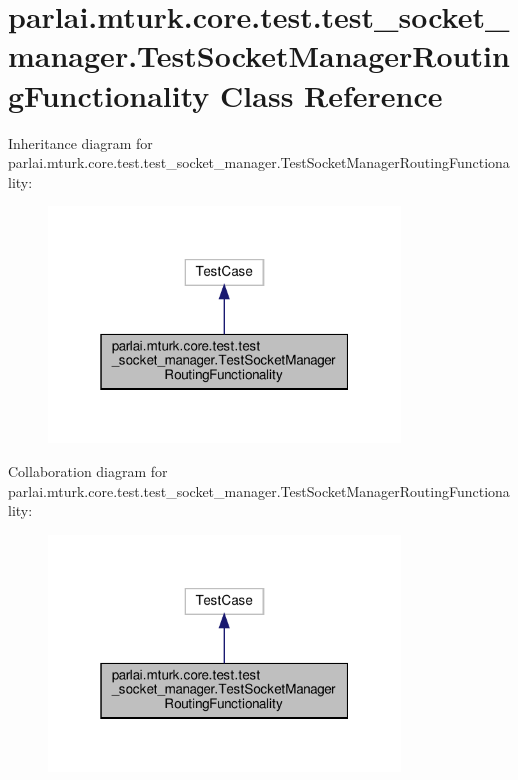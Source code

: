 \hypertarget{classparlai_1_1mturk_1_1core_1_1test_1_1test__socket__manager_1_1TestSocketManagerRoutingFunctionality}{}\section{parlai.\+mturk.\+core.\+test.\+test\+\_\+socket\+\_\+manager.\+Test\+Socket\+Manager\+Routing\+Functionality Class Reference}
\label{classparlai_1_1mturk_1_1core_1_1test_1_1test__socket__manager_1_1TestSocketManagerRoutingFunctionality}


Inheritance diagram for parlai.\+mturk.\+core.\+test.\+test\+\_\+socket\+\_\+manager.\+Test\+Socket\+Manager\+Routing\+Functionality\+:\nopagebreak
\begin{figure}[H]
\begin{center}
\leavevmode
\includegraphics[width=265pt]{db/d6b/classparlai_1_1mturk_1_1core_1_1test_1_1test__socket__manager_1_1TestSocketManagerRoutingFunctionality__inherit__graph}
\end{center}
\end{figure}


Collaboration diagram for parlai.\+mturk.\+core.\+test.\+test\+\_\+socket\+\_\+manager.\+Test\+Socket\+Manager\+Routing\+Functionality\+:\nopagebreak
\begin{figure}[H]
\begin{center}
\leavevmode
\includegraphics[width=265pt]{dc/d51/classparlai_1_1mturk_1_1core_1_1test_1_1test__socket__manager_1_1TestSocketManagerRoutingFunctionality__coll__graph}
\end{center}
\end{figure}
